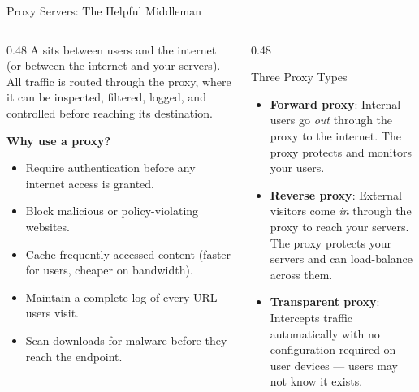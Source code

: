 \documentclass[aspectratio=169]{beamer}  %
\begin{document}
\begin{frame}{Proxy Servers: The Helpful Middleman}
    \begin{columns}[T]
        \begin{column}{0.48\textwidth}
            \footnotesize
            A  sits between users and the internet (or between the internet and your servers). All traffic is routed through the proxy, where it can be inspected, filtered, logged, and controlled before reaching its destination.

            \vspace{0.4em}
            \textbf{Why use a proxy?}
            \begin{itemize}
                \item Require authentication before any internet access is granted.
                \item Block malicious or policy-violating websites.
                \item Cache frequently accessed content (faster for users, cheaper on bandwidth).
                \item Maintain a complete log of every URL users visit.
                \item Scan downloads for malware before they reach the endpoint.
            \end{itemize}
        \end{column}
        \begin{column}{0.48\textwidth}
            \begin{exampleblock}{Three Proxy Types}
                \footnotesize
                \begin{itemize}
                    \item \textbf{Forward proxy}: Internal users go \emph{out} through the proxy to the internet. The proxy protects and monitors your users.
                    \item \textbf{Reverse proxy}: External visitors come \emph{in} through the proxy to reach your servers. The proxy protects your servers and can load-balance across them.
                    \item \textbf{Transparent proxy}: Intercepts traffic automatically with no configuration required on user devices --- users may not know it exists.
                \end{itemize}
            \end{exampleblock}
        \end{column}
    \end{columns}
\end{frame}
\end{document}
